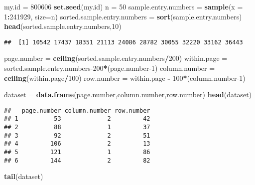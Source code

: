 \documentclass[]{book}
\newenvironment{Shaded}{\begin{snugshade}}{\end{snugshade}}
\newcommand{\DataTypeTok}[1]{\textcolor[rgb]{0.13,0.29,0.53}{#1}}
\newcommand{\DecValTok}[1]{\textcolor[rgb]{0.00,0.00,0.81}{#1}}
\newcommand{\KeywordTok}[1]{\textcolor[rgb]{0.13,0.29,0.53}{\textbf{#1}}}
\newcommand{\NormalTok}[1]{#1}
\newcommand{\OperatorTok}[1]{\textcolor[rgb]{0.81,0.36,0.00}{\textbf{#1}}}
\newcommand{\StringTok}[1]{\textcolor[rgb]{0.31,0.60,0.02}{#1}}
\begin{document}
\begin{Shaded}
\begin{Highlighting}[]
\NormalTok{my.id =}\StringTok{ }\DecValTok{800606}
\KeywordTok{set.seed}\NormalTok{(my.id)}
\NormalTok{n =}\StringTok{ }\DecValTok{50}
\NormalTok{sample.entry.numbers =}\StringTok{ }\KeywordTok{sample}\NormalTok{(}\DataTypeTok{x =} \DecValTok{1}\OperatorTok{:}\DecValTok{241929}\NormalTok{, }\DataTypeTok{size=}\NormalTok{n)}
\NormalTok{sorted.sample.entry.numbers =}\StringTok{ }\KeywordTok{sort}\NormalTok{(sample.entry.numbers)}
\KeywordTok{head}\NormalTok{(sorted.sample.entry.numbers,}\DecValTok{10}\NormalTok{)}
\end{Highlighting}
\end{Shaded}

\begin{verbatim}
##  [1] 10542 17437 18351 21113 24086 28782 30055 32220 33162 36443
\end{verbatim}

\begin{Shaded}
\begin{Highlighting}[]
\NormalTok{page.number =}\StringTok{ }\KeywordTok{ceiling}\NormalTok{(sorted.sample.entry.numbers}\OperatorTok{/}\DecValTok{200}\NormalTok{)}
\NormalTok{within.page =}\StringTok{ }\NormalTok{sorted.sample.entry.numbers}\DecValTok{-200}\OperatorTok{*}\NormalTok{(page.number}\DecValTok{-1}\NormalTok{)}
\NormalTok{column.number =}\StringTok{ }\KeywordTok{ceiling}\NormalTok{(within.page}\OperatorTok{/}\DecValTok{100}\NormalTok{)}
\NormalTok{row.number =}\StringTok{ }\NormalTok{within.page }\OperatorTok{-}\StringTok{ }\DecValTok{100}\OperatorTok{*}\NormalTok{(column.number}\DecValTok{-1}\NormalTok{)}

\NormalTok{dataset =}\StringTok{ }\KeywordTok{data.frame}\NormalTok{(page.number,column.number,row.number)}
\KeywordTok{head}\NormalTok{(dataset)}
\end{Highlighting}
\end{Shaded}

\begin{verbatim}
##   page.number column.number row.number
## 1          53             2         42
## 2          88             1         37
## 3          92             2         51
## 4         106             2         13
## 5         121             1         86
## 6         144             2         82
\end{verbatim}

\begin{Shaded}
\begin{Highlighting}[]
\KeywordTok{tail}\NormalTok{(dataset)}
\end{Highlighting}
\end{Shaded}
\end{document}
